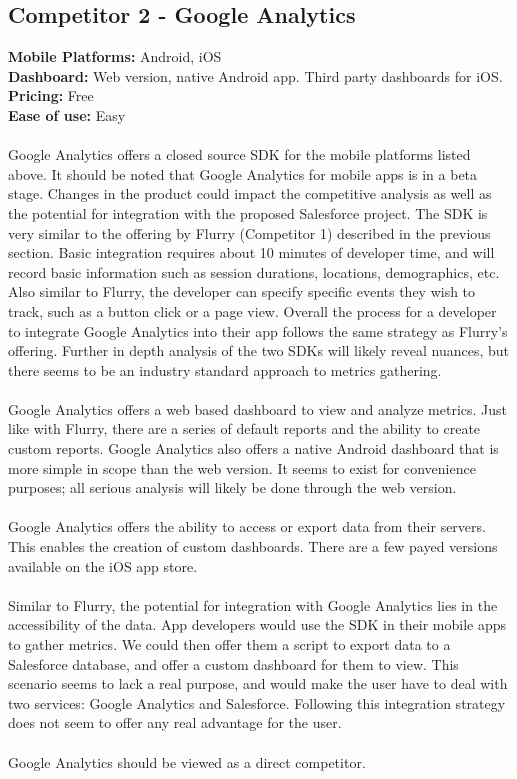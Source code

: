 \documentclass[12pt,oneside,letterpaper]{article}
\begin{document}
\subsection{Competitor 2 - Google Analytics}
\textbf{Mobile Platforms:} Android, iOS\\
\textbf{Dashboard:} Web version, native Android app. Third party dashboards for iOS.\\
\textbf{Pricing:} Free\\
\textbf{Ease of use:} Easy\\
\\
Google Analytics offers a closed source SDK for the mobile platforms listed above. It should be noted that Google Analytics for mobile apps is in a beta stage. Changes in the product could impact the competitive analysis as well as the potential for integration with the proposed Salesforce project. The SDK is very similar to the offering by Flurry (Competitor 1) described in the previous section. Basic integration requires about 10 minutes of developer time, and will record basic information such as session durations, locations, demographics, etc. Also similar to Flurry, the developer can specify specific events they wish to track, such as a button click or a page view. Overall the process for a developer to integrate Google Analytics into their app follows the same strategy as Flurry's offering. Further in depth analysis of the two SDKs will likely reveal nuances, but there seems to be an industry standard approach to metrics gathering.\\\\
Google Analytics offers a web based dashboard to view and analyze metrics. Just like with Flurry, there are a series of default reports and the ability to create custom reports. Google Analytics also offers a native Android dashboard that is more simple in scope than the web version. It seems to exist for convenience purposes; all serious analysis will likely be done through the web version.\\\\
Google Analytics offers the ability to access or export data from their servers. This enables the creation of custom dashboards. There are a few payed versions available on the iOS app store.\\\\
Similar to Flurry, the potential for integration with Google Analytics lies in the accessibility of the data. App developers would use the SDK in their mobile apps to gather metrics. We could then offer them a script to export data to a Salesforce database, and offer a custom dashboard for them to view. This scenario seems to lack a real purpose, and would make the user have to deal with two services: Google Analytics and Salesforce. Following this integration strategy does not seem to offer any real advantage for the user.\\\\
Google Analytics should be viewed as a direct competitor.
\end{document}
